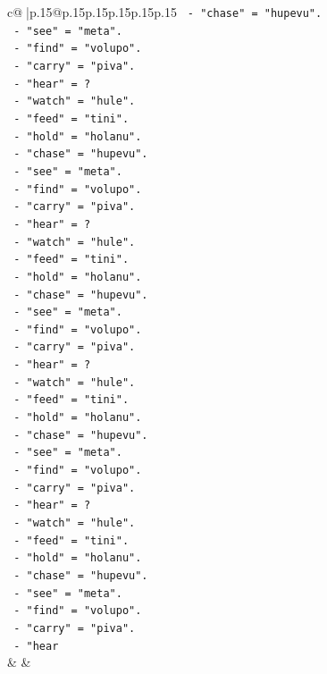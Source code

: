 \documentclass{article}
\begin{document}
{\begin{supertabular}{c@{$\;$}|p{.15\linewidth}@{}p{.15\linewidth}p{.15\linewidth}p{.15\linewidth}p{.15\linewidth}p{.15\linewidth}}
{{{\texttt{       {-} "chase" = "hupevu".} \\
\texttt{       {-} "see" = "meta".} \\
\texttt{       {-} "find" = "volupo".} \\
\texttt{       {-} "carry" = "piva".} \\
\texttt{       {-} "hear" = ?} \\
\texttt{       {-} "watch" = "hule".} \\
\texttt{       {-} "feed" = "tini".} \\
\texttt{       {-} "hold" = "holanu".} \\
\texttt{       {-} "chase" = "hupevu".} \\
\texttt{       {-} "see" = "meta".} \\
\texttt{       {-} "find" = "volupo".} \\
\texttt{       {-} "carry" = "piva".} \\
\texttt{       {-} "hear" = ?} \\
\texttt{       {-} "watch" = "hule".} \\
\texttt{       {-} "feed" = "tini".} \\
\texttt{       {-} "hold" = "holanu".} \\
\texttt{       {-} "chase" = "hupevu".} \\
\texttt{       {-} "see" = "meta".} \\
\texttt{       {-} "find" = "volupo".} \\
\texttt{       {-} "carry" = "piva".} \\
\texttt{       {-} "hear" = ?} \\
\texttt{       {-} "watch" = "hule".} \\
\texttt{       {-} "feed" = "tini".} \\
\texttt{       {-} "hold" = "holanu".} \\
\texttt{       {-} "chase" = "hupevu".} \\
\texttt{       {-} "see" = "meta".} \\
\texttt{       {-} "find" = "volupo".} \\
\texttt{       {-} "carry" = "piva".} \\
\texttt{       {-} "hear" = ?} \\
\texttt{       {-} "watch" = "hule".} \\
\texttt{       {-} "feed" = "tini".} \\
\texttt{       {-} "hold" = "holanu".} \\
\texttt{       {-} "chase" = "hupevu".} \\
\texttt{       {-} "see" = "meta".} \\
\texttt{       {-} "find" = "volupo".} \\
\texttt{       {-} "carry" = "piva".} \\
\texttt{       {-} "hear} \\
            }
        }
    }
    & & \\ \\


\end{supertabular}}
\end{document}
